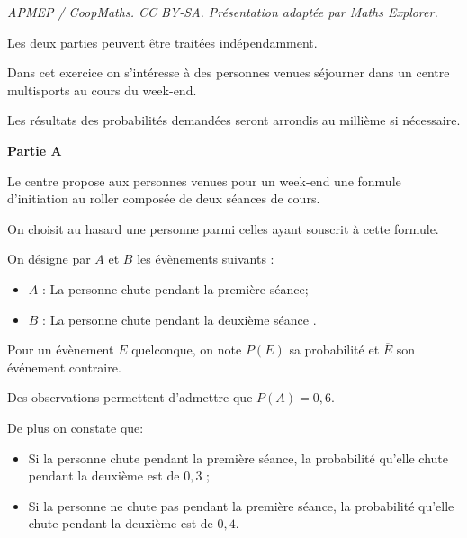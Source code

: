 \documentclass[10pt]{article}
\begin{document}
\noindent\textit{APMEP / CoopMaths. CC BY-SA. Présentation adaptée par Maths Explorer.}\par\medskip
\medskip

Les deux parties peuvent être traitées indépendamment.

Dans cet exercice on s'intéresse à des personnes venues séjourner dans un centre multisports au cours du week-end.

Les résultats des probabilités demandées seront arrondis au millième si nécessaire.

\bigskip

\begin{center}\textbf{Partie A} \end{center}

 Le centre propose aux personnes venues pour un week-end une fonmule d'initiation
au roller composée de deux séances de cours.

On choisit au hasard une personne parmi celles ayant souscrit à cette formule.

\medskip

On désigne par $A$ et $B$ les évènements suivants :

\begin{itemize}[label=$\bullet~$]
\item $A$ : \og La personne chute pendant la première séance\fg ;
\item $B$ : \og La personne chute pendant la deuxième séance \fg.
\end{itemize}

Pour un évènement $E$ quelconque, on note $P(E)$ sa probabilité et $\overline{E}$ son événement contraire.

Des observations permettent d'admettre que $P(A) = 0,6$.

De plus on constate que:

\begin{itemize}[label=$\bullet~$]
\item Si la personne chute pendant la première séance, la probabilité qu'elle chute pendant la deuxième est de $0,3$ ;
\item Si la personne ne chute pas pendant la première séance, la probabilité qu'elle chute pendant la deuxième est de $0,4$.
\end{itemize}

\medskip
\end{document}

